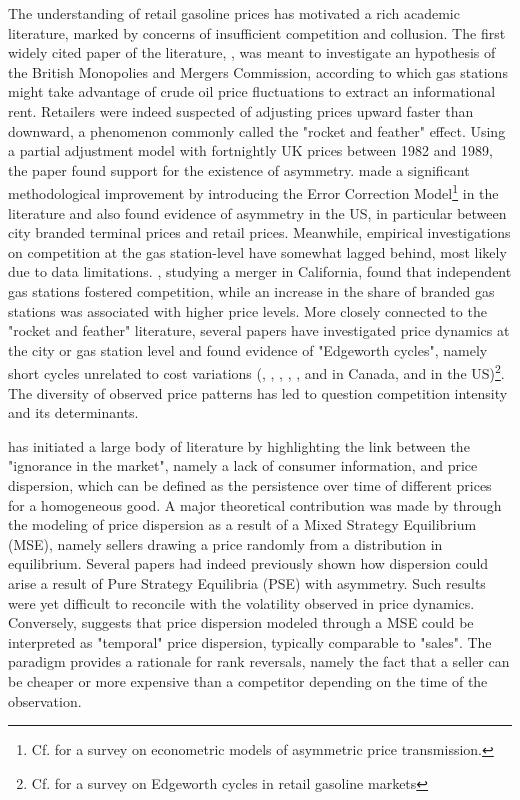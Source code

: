 \documentclass[english]{article}
\begin{document}
The understanding of retail gasoline prices has motivated a rich academic literature, marked by concerns of insufficient competition and collusion. The first widely cited paper of the literature, \cite{BAC91}, was meant to investigate an hypothesis of the British Monopolies and Mergers Commission, according to which gas stations might take advantage of crude oil price fluctuations to extract an informational rent. Retailers were indeed suspected of adjusting prices upward faster than downward, a phenomenon commonly called the "rocket and feather" effect. Using a partial adjustment model with fortnightly UK prices between 1982 and 1989, the paper found support for the existence of asymmetry. \cite{BOR97} made a significant methodological improvement by introducing the Error Correction Model\footnote{Cf. \cite{FRE07} for a survey on econometric models of asymmetric price transmission.} in the literature and also found evidence of asymmetry in the US, in particular between city branded terminal prices and retail prices. Meanwhile, empirical investigations on competition at the gas station-level have somewhat lagged behind, most likely due to data limitations. \cite{HAS04}, studying a merger in California, found that independent gas stations fostered competition, while an increase in the share of branded gas stations was associated with higher price levels. More closely connected to the "rocket and feather" literature, several papers have investigated price dynamics at the city or gas station level and found evidence of "Edgeworth cycles", namely short cycles unrelated to cost variations (\cite{ECK02}, \cite{ECK03}, \cite{ECK04a}, \cite{ECK04b}, \cite{NOE07a}, \cite{NOE07b} and \cite{NOE08} in Canada, \cite{LEW09} and \cite{LEW11a} in the US)\footnote{Cf. \cite{ECK13} for a survey on Edgeworth cycles in retail gasoline markets}. The diversity of observed price patterns has led to question competition intensity and its determinants.

\cite{STI61} has initiated a large body of literature by highlighting the link between the "ignorance in the market", namely a lack of consumer information, and price dispersion, which can be defined as the persistence over time of different prices for a homogeneous good. A major theoretical contribution was made by \cite{VAR80} through the modeling of price dispersion as a result of a Mixed Strategy Equilibrium (MSE), namely sellers drawing a price randomly from a distribution in equilibrium. Several papers had indeed previously shown how dispersion could arise a result of Pure Strategy Equilibria (PSE) with asymmetry. Such results were yet difficult to reconcile with the volatility observed in price dynamics. Conversely, \cite{VAR80} suggests that price dispersion modeled through a MSE could be interpreted as "temporal" price dispersion, typically comparable to "sales". The \cite{VAR80} paradigm provides a rationale for rank reversals, namely the fact that a seller can be cheaper or more expensive than a competitor depending on the time of the observation.
\end{document}
